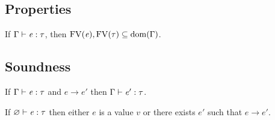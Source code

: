 \subsection{Properties}
\newcommand{\FV}{\mathrm{FV}}
\newcommand{\dom}{\mathrm{dom}}

\begin{lem}
If $\Gamma  \vdash  \mathit{e}  :  \tau$, then $\FV(\ottnt{e}),\FV(\tau) \subseteq \dom(\Gamma)$.
\end{lem}

\begin{lem}

\end{lem}

\subsection{Soundness}
\begin{lem}
If $\Gamma  \vdash  \mathit{e}  :  \tau$ and $e  \longrightarrow  e'$ then $\Gamma  \vdash  \mathit{e'}  :  \tau$.
\end{lem}

\begin{lem}[Progress]
If $\varnothing  \vdash  \mathit{e}  :  \tau$ then either $e$ is a value $v$ or there exists $e'$ such that $e  \longrightarrow  e'$.
\end{lem}

